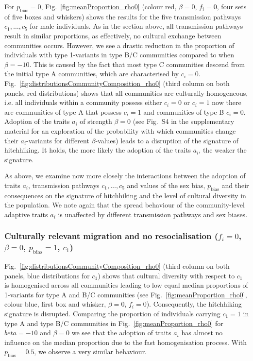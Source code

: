 \documentclass[9pt,twocolumn,twoside,lineno]{pnas-new}
\begin{document}
For $p_\text{bias}=0$, Fig.~\ref{fig:meanProportion_rho0} (colour red, $\beta=0$, $f_i=0$, four sets of five boxes and whiskers) shows the results for the five transmission pathways $c_1,\ldots,c_5$ for male individuals. 
As in the section above, all transmission pathways result in similar proportions, as effectively, no cultural exchange between communities occurs. However, we see a drastic reduction in the proportion of individuals with type 1-variants in type B/C communities compared to when $\beta=-10$. This is caused by the fact that most type C communities descend from the initial type A communities, which are characterised by $c_i = 0$. 
Fig.~\ref{fig:distributionsCommunityComposition_rho0} (third column on both panels, red distributions) shows that all communities are culturally homogeneous, i.e. all individuals within a community possess either $c_i=0$ or $c_i=1$ now there are communities of type A that possess $c_i=1$ and communities of type B $c_i=0$.
Adoption of the traits $a_i$ of strength $\beta=0$ (see Fig.~S4 in the supplementary material for an exploration of the probability with which communities change their $a_i$-variants for different $\beta$-values) leads to a disruption of the signature of hitchhiking. It holds, the more likely the adoption of the traits $a_i$, the weaker the signature. 

As above, we examine now more closely the interactions between the adoption of traits $a_i$, transmission pathways $c_1,\ldots,c_5$ and values of the sex bias, $p_\text{bias}$ and their consequences on the signature of hitchhiking and the level of cultural diversity in the population. We note again that the spread behaviour of the community-level adaptive traits $a_i$ is unaffected by different transmission pathways and sex biases.

\subsubsection*{Culturally relevant migration and no resocialisation ($f_i=0$, $\beta=0$, $p_\text{bias}=1$, $c_1$)}

Fig.~\ref{fig:distributionsCommunityComposition_rho0} (third column on both panels, blue distributions for $c_1$) shows that cultural diversity with respect to $c_1$ is homogenised across all communities leading to low equal median proportions of 1-variants for type A and B/C communities (see Fig.~\ref{fig:meanProportion_rho0}, colour blue, first box and whisker, $\beta=0$, $f_i=0$). Consequently, the hitchhiking signature is disrupted. Comparing the proportion of individuals carrying $c_1=1$ in type A and type B/C communities in Fig.~\ref{fig:meanProportion_rho0} for $beta=-10$ and $\beta=0$ we see that the adoption of traits $a_i$ has almost no influence on the median proportion due to the fast homogenisation process. With  $p_\text{bias}=0.5$, we observe a very similar behaviour.  
\end{document}
